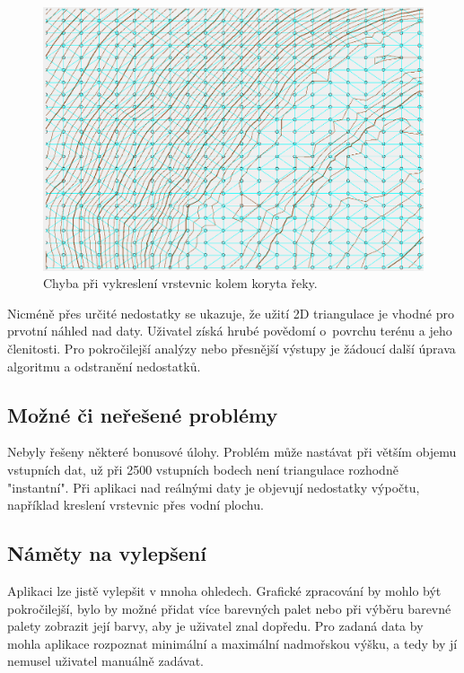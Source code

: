 \documentclass[a4paper, 12pt, oneside, titlepage]{article} %
\begin{document}
\begin{figure}[!htb]
	\centering
	\includegraphics[scale=0.5]{obrazky/reka1.png} 
	\caption{Chyba při vykreslení vrstevnic kolem koryta řeky.
	}
	\label{fig:reka1}
\end{figure} 
\FloatBarrier


Nicméně přes určité nedostatky se ukazuje, že užití 2D triangulace je vhodné pro prvotní náhled nad daty. Uživatel získá hrubé povědomí o~povrchu terénu a jeho členitosti. Pro pokročilejší analýzy nebo přesnější výstupy je žádoucí další úprava algoritmu a odstranění nedostatků.

\subsection{Možné či neřešené problémy} \label{mcn_problemy}
Nebyly řešeny některé bonusové úlohy. Problém může nastávat při větším objemu vstupních dat, už při 2500 vstupních bodech není triangulace rozhodně "instantní". 
Při aplikaci nad reálnými daty je objevují nedostatky výpočtu, například kreslení vrstevnic přes vodní plochu.

\subsection{Náměty na vylepšení} \label{vylepseni}
Aplikaci lze jistě vylepšit v mnoha ohledech. Grafické zpracování by mohlo být pokročilejší, bylo by možné přidat více barevných palet nebo při výběru barevné palety zobrazit její barvy, aby je uživatel znal dopředu. 
Pro zadaná data by mohla aplikace rozpoznat minimální a maximální nadmořskou výšku, a tedy by jí nemusel uživatel manuálně zadávat.
\end{document}
